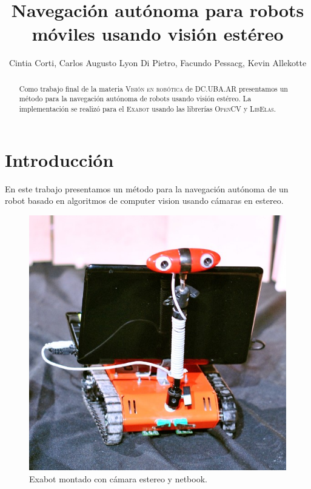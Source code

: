 \documentclass[journal,a4paper]{IEEEtran}
\begin{document}
\title{Navegación autónoma para robots móviles usando visión estéreo}
\author{Cintia Corti, Carlos Augusto Lyon Di Pietro, Facundo Pessacg, Kevin Allekotte}

\maketitle

\begin{abstract}
Como trabajo final de la materia \textsc{Visión en robótica} de \textsc{DC.UBA.AR}
presentamos un método para la navegación autónoma de robots usando visión estéreo.
La implementación se realizó para el \textsc{Exabot} usando las librerías \textsc{OpenCV} y \textsc{LibElas}.
\end{abstract}

\section{Introducción}
En este trabajo presentamos un método para la navegación autónoma de un robot basado en algoritmos de computer vision usando cámaras en estereo.

\begin{figure}[h!]
    \centering
    \includegraphics[width=0.9\linewidth]{exa.jpg}
    \caption{Exabot montado con cámara estereo y netbook.}
    \label{fig_exa}
\end{figure}
\end{document}
